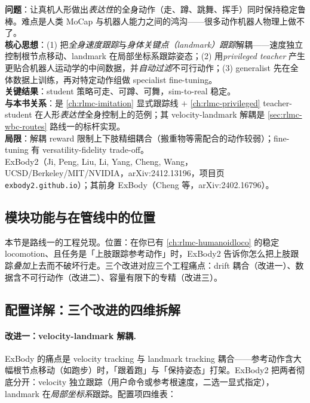 \begin{paper}\label{paper:rlmc-wbc-exbody2}
\textbf{问题}：让真机人形做出\emph{表达性}的全身动作（走、蹲、跳舞、挥手）同时保持稳定鲁棒。难点是人类 MoCap 与机器人能力之间的鸿沟——很多动作机器人物理上做不了。\\
\textbf{核心思想}：(1) 把\emph{全身速度跟踪}与\emph{身体关键点（landmark）跟踪}解耦——速度独立控制根节点移动、landmark 在局部坐标系跟踪姿态；(2) 用\emph{privileged teacher} 产生更贴合机器人运动学的中间数据，并\emph{自动过滤}不可行动作；(3) generalist 先在全体数据上训练，再对特定动作组做 specialist fine-tuning。\\
\textbf{关键结果}：student 策略可走、可蹲、可舞，sim-to-real 稳定。\\
\textbf{与本书关系}：是 \cref{ch:rlmc-imitation} 显式跟踪线 $+$ \cref{ch:rlmc-privileged} teacher-student 在人形\emph{表达性}全身控制上的范例；其 velocity-landmark 解耦是 \cref{sec:rlmc-wbc-routes} 路线一的标杆实现。\\
\textbf{局限}：解耦 reward 限制上下肢精细耦合（搬重物等需配合的动作较弱）；fine-tuning 有 versatility-fidelity trade-off。\\
ExBody2（Ji, Peng, Liu, Li, Yang, Cheng, Wang，UCSD/Berkeley/MIT/NVIDIA，arXiv:2412.13196，项目页 \texttt{exbody2.\allowbreak github.\allowbreak io}）\cite{ji2024exbody2}；其前身 ExBody（Cheng 等，arXiv:2402.16796）\cite{cheng2024exbody}。
\end{paper}

\subsection{模块功能与在管线中的位置}
本节是路线一的工程兑现。位置：在你已有 \cref{ch:rlmc-humanoidloco} 的稳定 locomotion、且任务是「上肢跟踪参考动作」时，ExBody2 告诉你怎么把上肢跟踪\emph{叠加}上去而不破坏行走。三个改进对应三个工程痛点：drift 耦合（改进一）、数据含不可行动作（改进二）、容量有限下的专精（改进三）。

\subsection{配置详解：三个改进的四维拆解}

\paragraph{改进一：velocity-landmark 解耦.}
ExBody 的痛点是 velocity tracking 与 landmark tracking 耦合——参考动作含大幅根节点移动（如跑步）时，「跟着跑」与「保持姿态」打架。ExBody2 把两者彻底分开：velocity 独立跟踪（用户命令或参考根速度，二选一显式指定），landmark 在\emph{局部坐标系}跟踪。配置项四维表：

